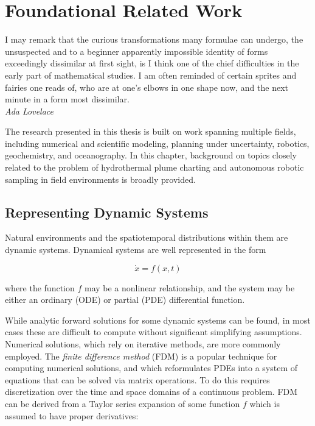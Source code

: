 \chapter{Foundational Related Work}
\label{chap:related_work}

\begin{center}
    \begin{minipage}{0.7\textwidth}
      \begin{small}
        I may remark that the curious transformations many formulae can undergo, the unsuspected and to a beginner apparently impossible identity of forms exceedingly dissimilar at first sight, is I think one of the chief difficulties in the early part of mathematical studies. I am often reminded of certain sprites and fairies one reads of, who are at one's elbows in one shape now, and the next minute in a form most dissimilar.\\ \emph{Ada Lovelace}
      \end{small}
    \end{minipage}
    \vspace{0.5cm}
\end{center}

The research presented in this thesis is built on work spanning multiple fields, including numerical and scientific modeling, planning under uncertainty, robotics, geochemistry, and oceanography. In this chapter, background on topics closely related to the problem of hydrothermal plume charting and autonomous robotic sampling in field environments is broadly provided.

\section{Representing Dynamic Systems}
\label{sec:dyn_sys}
Natural environments and the spatiotemporal distributions within them are dynamic systems.
Dynamical systems are well represented in the form

\begin{equation}
    \dot{x} = f(x,t)
\end{equation}

\noindent where the function $f$ may be a nonlinear relationship, and the system may be either an ordinary (ODE) or partial (PDE) differential function.

While analytic forward solutions for some dynamic systems can be found, in most cases these are difficult to compute without significant simplifying assumptions. Numerical solutions, which rely on iterative methods, are more commonly employed. The \emph{finite difference method} \autocite{smith1985numerical} (FDM) is a popular technique for computing numerical solutions, and which reformulates PDEs into a system of equations that can be solved via matrix operations. To do this requires discretization over the time and space domains of a continuous problem. FDM can be derived from a Taylor series expansion of some function $f$ which is assumed to have proper derivatives:


